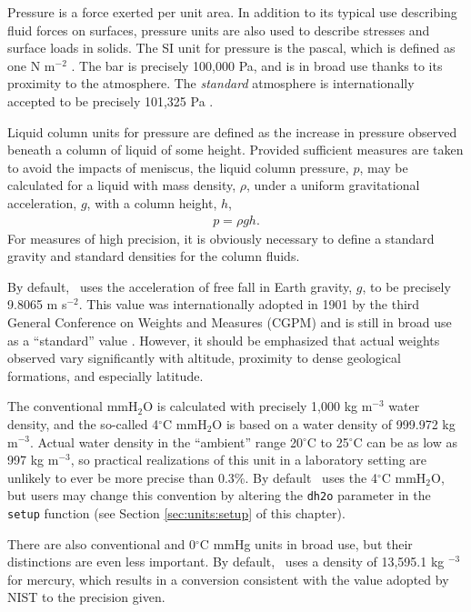 Pressure is a force exerted per unit area.  In addition to its typical use describing fluid forces on surfaces, pressure units are also used to describe stresses and surface loads in solids.  The SI unit for pressure is the pascal, which is defined as one N m$^{-2}$ \cite{bipm}.  The bar is precisely 100,000 Pa, and is in broad use thanks to its proximity to the atmosphere.  The \emph{standard} atmosphere is internationally accepted to be precisely 101,325 Pa \cite{CPC}.  

Liquid column units for pressure are defined as the increase in pressure observed beneath a column of liquid of some height.  Provided sufficient measures are taken to avoid the impacts of meniscus, the liquid column pressure, $p$, may be calculated for a liquid with mass density, $\rho$, under a uniform gravitational acceleration, $g$, with a column height, $h$,
\begin{align}
p = \rho g h.
\end{align}
For measures of high precision, it is obviously necessary to define a standard gravity and standard densities for the column fluids.

By default, \PM\ uses the acceleration of free fall in Earth gravity, $g$, to be precisely 9.8065 m s$^{-2}$.  This value was internationally adopted in 1901 by the third General Conference on Weights and Measures (CGPM)\cite{cgpm:3:2} and is still in broad use as a ``standard'' value \cite[p.45]{nist:sp1038} \cite[p.5]{nist:811}.  However, it should be emphasized that actual weights observed vary significantly with altitude, proximity to dense geological formations, and especially latitude.  

The conventional mmH$_2$O is calculated with precisely 1,000 kg m$^{-3}$ water density, and the so-called 4$^\circ$C mmH$_2$O is based on a water density of 999.972 kg m$^{-3}$.  Actual water density in the ``ambient'' range 20$^\circ$C to 25$^\circ$C can be as low as 997 kg m$^{-3}$, so practical realizations of this unit in a laboratory setting are unlikely to ever be more precise than 0.3\%.  By default \PM\ uses the 4$^\circ$C mmH$_2$O, but users may change this convention by altering the \verb|dh2o| parameter in the \verb|setup| function (see Section \ref{sec:units:setup} of this chapter).

There are also conventional and 0$^\circ$C mmHg units in broad use, but their distinctions are even less important.  By default, \PM\ uses a density of 13,595.1 kg $^{-3}$ for mercury, which results in a conversion consistent with the value adopted by NIST \cite[p.52]{nist:sp811} to the precision given.

